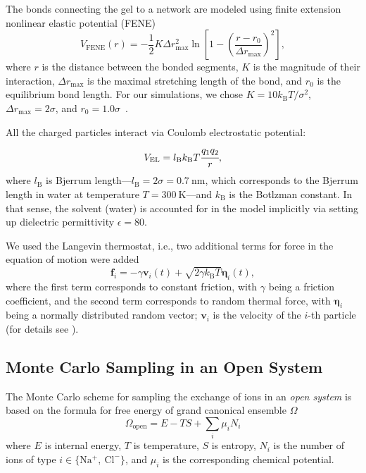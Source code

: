 \documentclass[gels,article,accept,pdftex,moreauthors]{Definitions/mdpi}
\newcommand{\ie}{{i.e.,} }
\newcommand{\kT}{k_\mathrm{B}T}
\newcommand{\kB}{k_\mathrm{B}}
\newcommand{\lb}{l_\mathrm{B}}
\newcommand{\cl}{\mathrm{Cl^-}}
\newcommand{\na}{\mathrm{Na^+}}
\begin{document}
The bonds connecting the gel to a network are modeled using finite extension nonlinear elastic potential (FENE)
\begin{equation}\label{eq:fene}
V_\mathrm{FENE}(r) = -\frac{1}{2} K \Delta r_\mathrm{max}^2\ln \left[ 1 - \left(\frac{r-r_0}{\Delta r_\mathrm{max}} \right)^2 \right ],
\end{equation}
where
$r$ is the distance between the bonded segments,
$K$ is the magnitude of their interaction,
$\Delta r_{\mathrm{max}}$ is the maximal stretching length of the bond, and
$r_0$ is the equilibrium bond length.
For our simulations, we chose $K = 10 \kT/\sigma^{2}$, $\Delta r_{\mathrm{max}} = 2 \sigma$, and $r_0 = 1.0\sigma$~\cite{Jin2007}.



All the charged particles interact via Coulomb electrostatic potential:
\begin{equation}
    V_{\mathrm{EL}}=\lb\kT \cfrac{q_{1}q_{2}}{r},
\end{equation}
where $\lb$ is Bjerrum length---$\lb = 2\sigma = 0.7~\mathrm{nm}$, which corresponds to the  Bjerrum length in water at temperature $T=300~\mathrm{K}$---and $\kB$ is the Botlzman constant.
In that sense, the solvent (water) is accounted for in the model implicitly via setting up dielectric permittivity $\epsilon=80$.

We used the Langevin thermostat, \ie two additional terms for force in the equation of motion were added
\begin{equation}
\mathbf{f}_i =  -\gamma \mathbf{v}_i(t)+\sqrt{2\gamma \kT }\boldsymbol{\eta}_i(t),
\end{equation}
where the first term corresponds to constant friction, with $\gamma$ being a friction coefficient,
 and the second term corresponds to random thermal force, with $\boldsymbol{\eta}_i$ being a normally distributed random vector; $\mathbf{v}_i$ is the velocity of the $i$-th particle (for details see \cite{Grest1986}).

\subsection{Monte Carlo Sampling in an Open System}
The Monte Carlo scheme for sampling the exchange of ions in an \emph{open system} is based on the formula for free energy of grand canonical ensemble $\Omega$
\begin{equation}
    \Omega_{\mathrm{open}}=E-TS+\sum_i\mu_i N_i\label{eq:Omega-GC}
\end{equation}
where $E$ is internal energy, $T$ is temperature, $S$ is entropy, $N_i$ is the number of ions of type $i\in\{\na,\ \cl\}$, and $\mu_i$ is the corresponding chemical potential.
\end{document}
